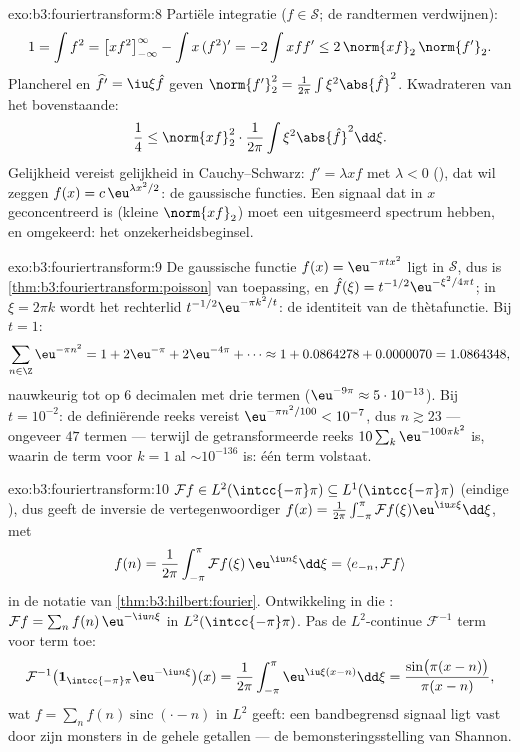 \begin{solution}{exo:b3:fouriertransform:8}
Partiële integratie ($f \in \mathcal S$; de randtermen
verdwijnen):
\[
1 = \int f^2 = \bigl[xf^2\bigr]_{-\infty}^{\infty} - \int
x\,(f^2)' = -2\int xff' \leq 2\,\norm{xf}_2\,\norm{f'}_2 .
\]
Plancherel en $\widehat{f'} = \iu\xi\hat f$ geven
$\norm{f'}_2^2 = \frac1{2\pi}\int\xi^2\abs{\hat f}^2$.
Kwadrateren van het bovenstaande:
\[
\frac14 \leq \norm{xf}_2^2\cdot\frac1{2\pi}
\int\xi^2\abs{\hat f}^2\dd\xi .
\]
Gelijkheid vereist gelijkheid in Cauchy--Schwarz: $f' = \lambda
xf$ met $\lambda < 0$ (), dat wil zeggen $f(x) =
c\,\eu^{\lambda x^2/2}$: de gaussische functies. Een signaal dat
in $x$ geconcentreerd is (kleine $\norm{xf}_2$) moet een
uitgesmeerd spectrum hebben, en omgekeerd: het
onzekerheidsbeginsel.
\end{solution}

\begin{solution}{exo:b3:fouriertransform:9}
De gaussische functie $f(x) = \eu^{-\pi tx^2}$ ligt in $\mathcal
S$, dus is \cref{thm:b3:fouriertransform:poisson} van toepassing,
en $\hat f(\xi) = t^{-1/2}\eu^{-\xi^2/4\pi t}$; in $\xi = 2\pi k$
wordt het rechterlid $t^{-1/2}\eu^{-\pi k^2/t}$: de identiteit
van de thètafunctie. Bij $t = 1$:
\[
\sum_{n\in\Z}\eu^{-\pi n^2} = 1 + 2\eu^{-\pi} + 2\eu^{-4\pi} +
\cdots \approx 1 + 0.0864278 + 0.0000070 = 1.0864348,
\]
nauwkeurig tot op $6$ decimalen met drie termen ($\eu^{-9\pi}
\approx 5\cdot10^{-13}$). Bij $t = 10^{-2}$: de definiërende
reeks vereist $\eu^{-\pi n^2/100} < 10^{-7}$, dus $n \gtrsim 23$
--- ongeveer $47$ termen --- terwijl de getransformeerde reeks
$10\sum_k\eu^{-100\pi k^2}$ is, waarin de term voor $k = 1$ al
$\sim 10^{-136}$ is: één term volstaat.
\end{solution}

\begin{solution}{exo:b3:fouriertransform:10}
$\mathcal Ff \in L^2(\intcc{-\pi}\pi) \subseteq
L^1(\intcc{-\pi}\pi)$ (eindige ), dus geeft de inversie de
 vertegenwoordiger $f(x) =
\frac1{2\pi}\int_{-\pi}^\pi\mathcal Ff(\xi)\eu^{\iu
x\xi}\dd\xi$, met
\[
f(n) = \frac1{2\pi}\int_{-\pi}^{\pi}\mathcal
Ff(\xi)\,\eu^{\iu n\xi}\dd\xi = \langle e_{-n}, \mathcal
Ff\rangle
\]
in de notatie van \cref{thm:b3:hilbert:fourier}. Ontwikkeling in
die : $\mathcal Ff = \sum_nf(n)\,\eu^{-\iu n\xi}$ in
$L^2(\intcc{-\pi}\pi)$. Pas de $L^2$-continue $\mathcal F^{-1}$
term voor term toe:
\[
\mathcal F^{-1}\bigl(\mathbf
1_{\intcc{-\pi}\pi}\eu^{-\iu n\xi}\bigr)(x)
= \frac1{2\pi}\int_{-\pi}^{\pi}\eu^{\iu\xi(x - n)}\dd\xi
= \frac{\sin\bigl(\pi(x-n)\bigr)}{\pi(x - n)} ,
\]
wat $f = \sum_nf(n)\operatorname{sinc}(\cdot - n)$ in $L^2$
geeft: een bandbegrensd signaal ligt vast door zijn monsters in
de gehele getallen --- de bemonsteringsstelling van Shannon.
\end{solution}

